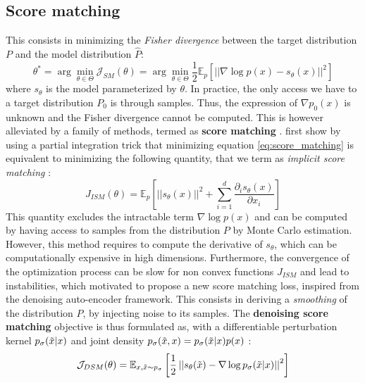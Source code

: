 \subsection{Score matching}
This consists in minimizing the \textit{Fisher divergence} between the target distribution $P$ and the model distribution $\hat{P}$:
\begin{equation}\label{eq:score_matching}
   \theta^{*} = \arg\min_{\theta \in \Theta} \mathcal{J}_{SM}(\theta) =\arg \min_{\theta \in \Theta} \frac{1}{2} \mathbb{E}_{p}\left[||\nabla \log p(x) - s_{\theta}(x) ||^{2}\right]
\end{equation}
where $s_{\theta}$ is the model parameterized by $\theta$.
In practice, the only access we have to a target distribution $P_{0}$ is through samples. Thus, the expression of $\nabla p_{0}(x)$ is unknown and the Fisher divergence cannot be computed. This is however alleviated by a family of methods, termed as \textbf{score matching} \citep{JMLR:v6:hyvarinen05a,vincent_connection_2011}.
\citep{JMLR:v6:hyvarinen05a} first show by using a partial integration trick that minimizing equation \ref{eq:score_matching} is equivalent to minimizing the following quantity, that we term as \textit{implicit score matching} : 
\begin{equation}\label{eq:implicit_score_matching}
    J_{ISM}(\theta) = \mathbb{E}_{p}\left[||s_{\theta}(x)||^{2} + \sum_{i=1}^{d} \frac{\partial_{i} s_{\theta}(x)}{\partial x_{i}}  \right]
\end{equation}
This quantity excludes the intractable term $\nabla \log p(x)$ and can be computed by having access to samples from the distribution $P$ by Monte Carlo estimation.
However, this method requires to compute the derivative of $s_{\theta}$, which can be computationally expensive in high dimensions. Furthermore, the convergence of the optimization process can be slow for non convex functions $J_{ISM}$ and lead to instabilities, which motivated \citep{vincent_connection_2011} to propose a new score matching loss, inspired from the denoising auto-encoder framework. This consists in deriving a \textit{smoothing} of the distribution $P$, by injecting noise to its samples. 
The \textbf{denoising score matching} objective is thus formulated as, with a differentiable perturbation kernel $p_{\sigma}(\Tilde{x}|x)$ and joint density $p_{\sigma}(\Tilde{x},x) =p_{\sigma}(\Tilde{x}|x)p(x)$ :
\begin{equation}\label{eq:denoising_score_matching}
    \mathcal{J}_{DSM}(\theta) = \mathbb{E}_{x,\Tilde{x}\sim p_{\sigma}}\left[\frac{1}{2} 
 \left|\left| s_{\theta}(\Tilde{x}) - \nabla \log p_{\sigma}(\Tilde{x}|x)\right|\right|^{2}\right]
\end{equation}
